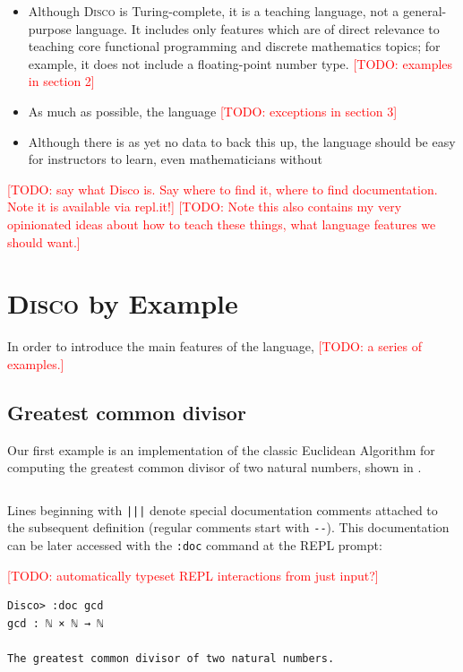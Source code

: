 \documentclass[submission,copyright,creativecommons]{eptcs}
\newcommand{\disco}{\textsc{Disco}\xspace}
\newcommand{\pref}[1]{\prettyref{#1}}
\newcommand{\todo}[1]{\textcolor{red}{[TODO: #1]}}
\newcommand{\todo}[1]{}
\begin{document}
\begin{itemize}
\item Although \disco is Turing-complete, it is a teaching language,
  not a general-purpose language.  It includes only features which are
  of direct relevance to teaching core functional programming and
  discrete mathematics topics; for example, it does not include a
  floating-point number type.  \todo{examples in section 2}
\item As much as possible, the language \todo{exceptions in section 3}
\item Although there is as yet no data to back this up, the language
  should be easy for instructors to learn, even mathematicians without 
\end{itemize}

\todo{say what Disco is.  Say where to find it, where to find
  documentation.  Note it is available via repl.it!}
\todo{Note this also contains my very opinionated ideas about how to
  teach these things, what language features we should want.}

\section{\disco by Example}

In order to introduce the main features of the language, \todo{a series
of examples.}

\subsection{Greatest common divisor}
\label{sec:gcd}

Our first example is an implementation of the classic Euclidean
Algorithm for computing the greatest common divisor of two natural
numbers, shown in \pref{lst:gcd}.

\begin{listing}[!htp]
\inputminted{text}{examples/gcd.disco}
\caption{Definition of \texttt{gcd} in \disco}
\label{lst:gcd}
\end{listing}

Lines beginning with \texttt{|||} denote special documentation
comments attached to the subsequent definition (regular comments start with
\texttt{-{}-}).  This documentation can be later accessed with the
\texttt{:doc} command at the REPL prompt:

\todo{automatically typeset REPL interactions from just input?}
\begin{verbatim}
Disco> :doc gcd
gcd : ℕ × ℕ → ℕ

The greatest common divisor of two natural numbers.

\end{verbatim}
\end{document}

